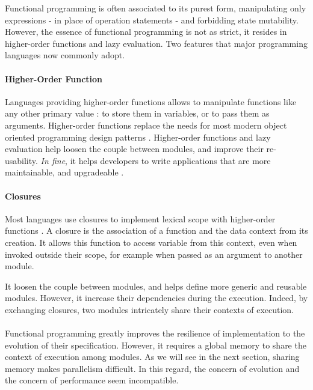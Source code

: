 Functional programming is often associated to its purest form, manipulating only expressions - in place of operation statements - and forbidding state mutability.
However, the essence of functional programming is not as strict, it resides in higher-order functions and lazy evaluation.
Two features that major programming languages now commonly adopt.

\paragraph{Higher-Order Function}

Languages providing higher-order functions allows to manipulate functions like any other primary value : to store them in variables, or to pass them as arguments.
Higher-order functions replace the needs for most modern object oriented programming design patterns .
Higher-order functions and lazy evaluation help loosen the couple between modules, and improve their re-usability.
\textit{In fine}, it helps developers to write applications that are more maintainable, and upgradeable \cite{Hughes1989}.

\paragraph{Closures}

Most languages use closures to implement lexical scope with higher-order functions \cite{Sussman1998}.
A closure is the association of a function and the data context from its creation.
It allows this function to access variable from this context, even when invoked outside their scope, for example when passed as an argument to another module.

It loosen the couple between modules, and helps define more generic and reusable modules.
However, it increase their dependencies during the execution.
Indeed, by exchanging closures, two modules intricately share their contexts of execution.

\paragraph{}

Functional programming greatly improves the resilience of implementation to the evolution of their specification.
However, it requires a global memory to share the context of execution among modules.
As we will see in the next section, sharing memory makes parallelism difficult.
In this regard, the concern of evolution and the concern of performance seem incompatible.


